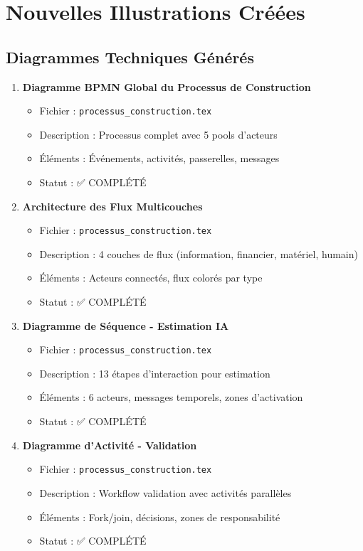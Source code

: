 \section{Nouvelles Illustrations Créées}

\subsection{Diagrammes Techniques Générés}

\begin{enumerate}
    \item \textbf{Diagramme BPMN Global du Processus de Construction}
    \begin{itemize}
        \item Fichier : \texttt{processus\_construction.tex}
        \item Description : Processus complet avec 5 pools d'acteurs
        \item Éléments : Événements, activités, passerelles, messages
        \item Statut : ✅ COMPLÉTÉ
    \end{itemize}
    
    \item \textbf{Architecture des Flux Multicouches}
    \begin{itemize}
        \item Fichier : \texttt{processus\_construction.tex}
        \item Description : 4 couches de flux (information, financier, matériel, humain)
        \item Éléments : Acteurs connectés, flux colorés par type
        \item Statut : ✅ COMPLÉTÉ
    \end{itemize}
    
    \item \textbf{Diagramme de Séquence - Estimation IA}
    \begin{itemize}
        \item Fichier : \texttt{processus\_construction.tex}
        \item Description : 13 étapes d'interaction pour estimation
        \item Éléments : 6 acteurs, messages temporels, zones d'activation
        \item Statut : ✅ COMPLÉTÉ
    \end{itemize}
    
    \item \textbf{Diagramme d'Activité - Validation}
    \begin{itemize}
        \item Fichier : \texttt{processus\_construction.tex}
        \item Description : Workflow validation avec activités parallèles
        \item Éléments : Fork/join, décisions, zones de responsabilité
        \item Statut : ✅ COMPLÉTÉ
    \end{itemize}
    

\end{enumerate}
